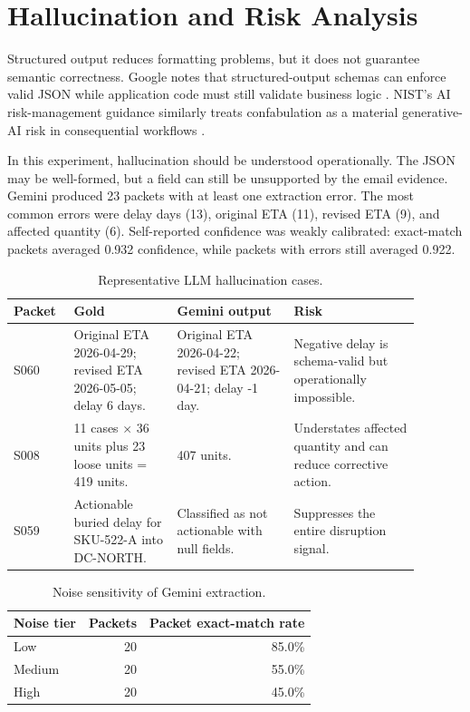 \documentclass[11pt]{article}
\begin{document}
\section{Hallucination and Risk Analysis}

Structured output reduces formatting problems, but it does not guarantee semantic correctness. Google notes that structured-output schemas can enforce valid JSON while application code must still validate business logic \citep{google2026structured}. NIST's AI risk-management guidance similarly treats confabulation as a material generative-AI risk in consequential workflows \citep{nist2024genai,nist2023airmf}.

In this experiment, hallucination should be understood operationally. The JSON may be well-formed, but a field can still be unsupported by the email evidence. Gemini produced 23 packets with at least one extraction error. The most common errors were delay days (13), original ETA (11), revised ETA (9), and affected quantity (6). Self-reported confidence was weakly calibrated: exact-match packets averaged 0.932 confidence, while packets with errors still averaged 0.922.

\begin{table}[H]
\centering
\caption{Representative LLM hallucination cases.}
\small
\begin{tabular}{@{}p{0.12\linewidth}p{0.23\linewidth}p{0.26\linewidth}p{0.28\linewidth}@{}}
\toprule
Packet & Gold & Gemini output & Risk \\
\midrule
S060 & Original ETA 2026-04-29; revised ETA 2026-05-05; delay 6 days. & Original ETA 2026-04-22; revised ETA 2026-04-21; delay -1 day. & Negative delay is schema-valid but operationally impossible. \\
S008 & 11 cases $\times$ 36 units plus 23 loose units = 419 units. & 407 units. & Understates affected quantity and can reduce corrective action. \\
S059 & Actionable buried delay for SKU-522-A into DC-NORTH. & Classified as not actionable with null fields. & Suppresses the entire disruption signal. \\
\bottomrule
\end{tabular}
\end{table}

\begin{table}[H]
\centering
\caption{Noise sensitivity of Gemini extraction.}
\small
\begin{tabular}{lrr}
\toprule
Noise tier & Packets & Packet exact-match rate \\
\midrule
Low & 20 & 85.0\% \\
Medium & 20 & 55.0\% \\
High & 20 & 45.0\% \\
\bottomrule
\end{tabular}
\end{table}
\end{document}
